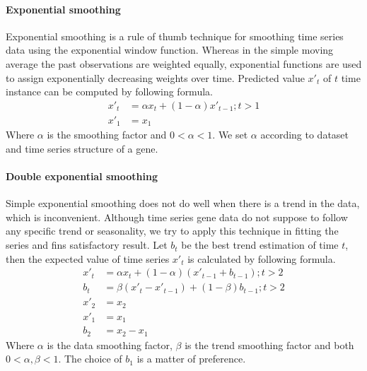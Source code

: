 \paragraph*{\textbf{Exponential smoothing}}
Exponential smoothing is a rule of thumb technique for smoothing time series data using the exponential window function. Whereas in the simple moving average the past observations are weighted equally, exponential functions are used to assign exponentially decreasing weights over time.
Predicted value $x'_t$ of $t$ time instance can be computed by following formula.
\begin{align*}
    x'_t &= \alpha x_t + (1-\alpha)x'_{t-1}; t>1  \\
    x'_1 &= x_1
\end{align*}
Where $\alpha$ is the smoothing factor and $0<\alpha<1$. We set $\alpha$ according to dataset and time series structure of a gene.
\paragraph*{\textbf{Double exponential smoothing}}
Simple exponential smoothing does not do well when there is a trend in the data, which is inconvenient. Although time series gene data do not suppose to follow any specific trend or seasonality, we try to apply this technique in fitting the series and fins satisfactory result.
Let $b_t$ be the best trend estimation of time $t$, then the expected value of time series $x'_t$ is calculated by following formula.
\begin{align*}
    x'_t &= \alpha x_t + (1-\alpha)(x'_{t-1}+b_{t-1}); t>2  \\
    b_t &= \beta(x'_t-x'_{t-1}) + (1-\beta)b_{t-1}; t>2  \\
    x'_2 &= x_2 \\
    x'_1 &= x_1 \\
    b_2 &= x_2 - x_1
\end{align*}
Where $\alpha$ is the data smoothing factor, $\beta$ is the trend smoothing factor and both $0<\alpha,\beta<1$. The choice of $b_1$ is a matter of preference.


